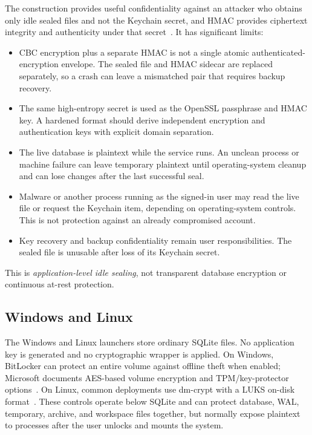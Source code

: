 The construction provides useful confidentiality against an attacker who obtains only idle sealed files and not the Keychain secret, and HMAC provides ciphertext integrity and authenticity under that secret~\cite{krawczyk1997hmac}. It has significant limits:

\begin{itemize}
  \item CBC encryption plus a separate HMAC is not a single atomic authenticated-encryption envelope. The sealed file and HMAC sidecar are replaced separately, so a crash can leave a mismatched pair that requires backup recovery.
  \item The same high-entropy secret is used as the OpenSSL passphrase and HMAC key. A hardened format should derive independent encryption and authentication keys with explicit domain separation.
  \item The live database is plaintext while the service runs. An unclean process or machine failure can leave temporary plaintext until operating-system cleanup and can lose changes after the last successful seal.
  \item Malware or another process running as the signed-in user may read the live file or request the Keychain item, depending on operating-system controls. This is not protection against an already compromised account.
  \item Key recovery and backup confidentiality remain user responsibilities. The sealed file is unusable after loss of its Keychain secret.
\end{itemize}

This is \emph{application-level idle sealing}, not transparent database encryption or continuous at-rest protection.

\subsection{Windows and Linux}

The Windows and Linux launchers store ordinary SQLite files. No application key is generated and no \system{} cryptographic wrapper is applied. On Windows, BitLocker can protect an entire volume against offline theft when enabled; Microsoft documents AES-based volume encryption and TPM/key-protector options~\cite{microsoftbitlocker}. On Linux, common deployments use dm-crypt with a LUKS on-disk format~\cite{cryptsetup}. These controls operate below SQLite and can protect database, WAL, temporary, archive, and workspace files together, but normally expose plaintext to processes after the user unlocks and mounts the system.


